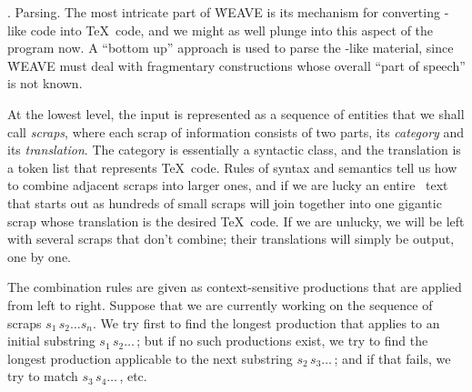 .  Parsing.
The most intricate part of \.{WEAVE} is its mechanism for converting
\PASCAL-like code into \TeX\ code, and we might as well plunge into this
aspect of the program now. A ``bottom up'' approach is used to parse the
\PASCAL-like material, since \.{WEAVE} must deal with fragmentary
constructions whose overall ``part of speech'' is not known.

At the lowest level, the input is represented as a sequence of entities
that we shall call {\it scraps}, where each scrap of information consists
of two parts, its {\it category} and its {\it translation}. The category
is essentially a syntactic class, and the translation is a token list that
represents \TeX\ code. Rules of syntax and semantics tell us how to
combine adjacent scraps into larger ones, and if we are lucky an entire
\PASCAL\ text that starts out as hundreds of small scraps will join
together into one gigantic scrap whose translation is the desired \TeX\
code. If we are unlucky, we will be left with several scraps that don't
combine; their translations will simply be output, one by one.

The combination rules are given as context-sensitive productions that are
applied from left to right. Suppose that we are currently working on the
sequence of scraps $s_1\,s_2\ldots s_n$. We try first to find the longest
production that applies to an initial substring $s_1\,s_2\ldots\,$; but if
no such productions exist, we try to find the longest production
applicable to the next substring $s_2\,s_3\ldots\,$; and if that fails, we
try to match $s_3\,s_4\ldots\,$, etc.

